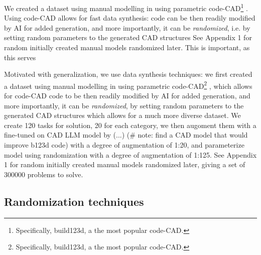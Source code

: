 \documentclass{article} %
\begin{document}
We created a dataset using manual modelling in using parametric code-CAD\footnote{Specifically, build123d, a the most popular code-CAD.} . Using code-CAD allows for fast data synthesis: code can be then readily modified by AI for added generation, and more importantly, it can be \textit{randomized}, i.e. by setting random parameters to the generated CAD structures See Appendix 1 for random initially created manual models randomized later. This is important, as this serves 

Motivated with generalization, we use data synthesis techniques: we first created a dataset using manual modelling in using parametric code-CAD\footnote{Specifically, build123d, a the most popular code-CAD.} , which allows for  code-CAD code to be then readily modified by AI for added generation, and more importantly, it can be \textit{randomized}, by setting random parameters to the generated CAD structures which allows for a much more diverse dataset. We create 120 tasks for solution, 20 for each category, we then augoment them with a fine-tuned on CAD LLM model by (...) (# note: find a CAD model that would improve b123d code) with a degree of augmentation of 1:20, and parameterize model using randomization with a degree of augmentation of 1:125. See Appendix 1 for random initially created manual models randomized later, giving a set of 300000 problems to solve.

\subsection{Randomization techniques}
\end{document}
